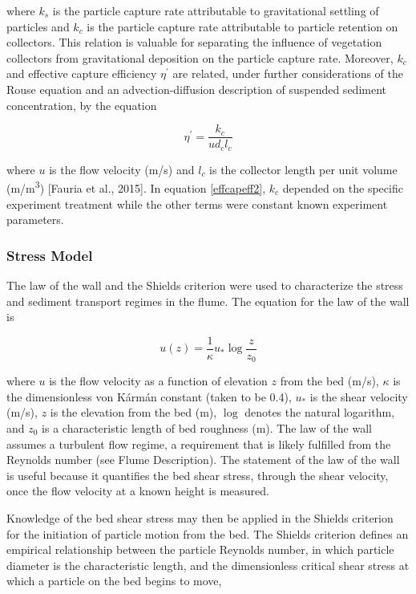 \documentclass[12pt]{article}
\begin{document}
\noindent where $k_s$ is the particle capture rate attributable to gravitational settling of particles and $k_c$ is the particle capture rate attributable to particle retention on collectors. This relation is valuable for separating the influence of vegetation collectors from gravitational deposition on the particle capture rate. Moreover, $k_c$ and effective capture efficiency $\eta^\prime$ are related, under further considerations of the Rouse equation and an advection-diffusion description of suspended sediment concentration, by the equation

\begin{equation} \label{effcapeff2}
    \eta^\prime=\frac{k_c}{u d_c l_c}
\end{equation}

\noindent where $u$ is the flow velocity (m/s) and $l_c$ is the collector length per unit volume (m/m\textsuperscript{3}) [Fauria et al., 2015]. In equation \ref{effcapeff2}, $k_c$ depended on the specific experiment treatment while the other terms were constant known experiment parameters.

\subsubsection{Stress Model}

The law of the wall and the Shields criterion were used to characterize the stress and sediment transport regimes in the flume. The equation for the law of the wall is

\begin{equation} \label{ltw}
    u(z)=\frac{1}{\kappa} u_* \log{\frac{z}{z_0}}
\end{equation}

\noindent where $u$ is the flow velocity as a function of elevation $z$ from the bed (m/s), $\kappa$ is the dimensionless von Kármán constant (taken to be 0.4), $u_*$ is the shear velocity (m/s), $z$ is the elevation from the bed (m), $\log$ denotes the natural logarithm, and $z_0$ is a characteristic length of bed roughness (m). The law of the wall assumes a turbulent flow regime, a requirement that is likely fulfilled from the Reynolds number (see Flume Description). The statement of the law of the wall is useful because it quantifies the bed shear stress, through the shear velocity, once the flow velocity at a known height is measured.

Knowledge of the bed shear stress may then be applied in the Shields criterion for the initiation of particle motion from the bed. The Shields criterion defines an empirical relationship between the particle Reynolds number, in which particle diameter is the characteristic length, and the dimensionless critical shear stress at which a particle on the bed begins to move,
\end{document}
